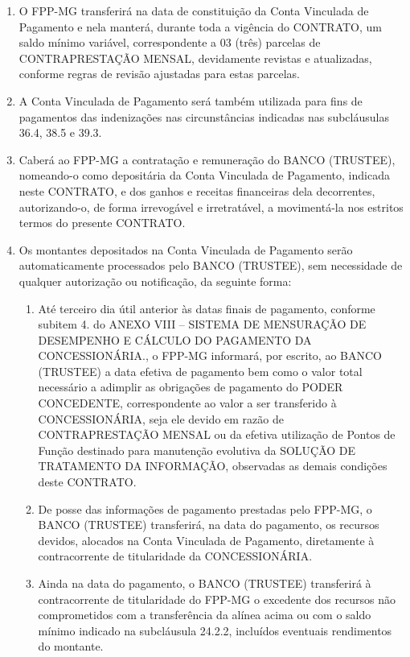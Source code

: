 \documentclass[a4paper,11pt]{report} %
\begin{document}
\begin{enumerate}
\begin{enumerate}[label*=\arabic*.]
\item \label{itm:RE9Y} O FPP-MG transferirá na data de constituição da Conta Vinculada de Pagamento e nela manterá, durante toda a vigência do CONTRATO, um saldo mínimo variável, correspondente a 03 (três) parcelas de CONTRAPRESTAÇÃO MENSAL, devidamente revistas e atualizadas, conforme regras de revisão ajustadas para estas parcelas.  

\item \label{itm:M33U} A Conta Vinculada de Pagamento será também utilizada para fins de pagamentos das indenizações nas circunstâncias indicadas nas subcláusulas 36.4, 38.5 e 39.3.

\item \label{itm:DPJV} Caberá ao FPP-MG a contratação e remuneração do BANCO (TRUSTEE), nomeando-o como depositária da Conta Vinculada de Pagamento, indicada neste CONTRATO, e dos ganhos e receitas financeiras dela decorrentes, autorizando-o, de forma irrevogável e irretratável, a movimentá-la nos estritos termos do presente CONTRATO.

\item \label{itm:FUDD} Os montantes depositados na Conta Vinculada de Pagamento serão automaticamente processados pelo BANCO (TRUSTEE), sem necessidade de qualquer autorização ou notificação, da seguinte forma:


\begin{enumerate}[label*=\arabic*.]
\item \label{itm:MY6H}  Até terceiro dia útil anterior às datas finais de pagamento, conforme subitem 4. do ANEXO VIII – SISTEMA DE MENSURAÇÃO DE DESEMPENHO E CÁLCULO DO PAGAMENTO DA CONCESSIONÁRIA., o FPP-MG informará, por escrito, ao BANCO (TRUSTEE) a data efetiva de pagamento bem como o valor total necessário a adimplir as obrigações de pagamento do PODER CONCEDENTE, correspondente ao valor a ser transferido à CONCESSIONÁRIA, seja ele devido em razão de CONTRAPRESTAÇÃO MENSAL ou da efetiva utilização de Pontos de Função destinado para manutenção evolutiva da SOLUÇÃO DE TRATAMENTO DA INFORMAÇÃO, observadas as demais condições deste CONTRATO. 

\item \label{itm:SLTW} De posse das informações de pagamento prestadas pelo FPP-MG, o BANCO (TRUSTEE) transferirá, na data do pagamento, os recursos devidos, alocados na Conta Vinculada de Pagamento, diretamente à contracorrente de titularidade da CONCESSIONÁRIA.

\item \label{itm:BJ4G} Ainda na data do pagamento, o BANCO (TRUSTEE) transferirá à contracorrente de titularidade do FPP-MG o excedente dos recursos não comprometidos com a transferência da alínea acima ou com o saldo mínimo indicado na subcláusula 24.2.2, incluídos eventuais rendimentos do montante.
\end{enumerate}
\end{enumerate}


\end{enumerate}
\end{document}
